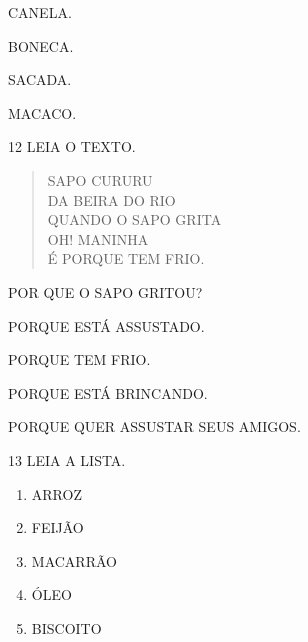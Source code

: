 \begin{escolha}[itemsep=0pt]
\item CANELA.

\item BONECA.

\item SACADA.

\item MACACO.
\end{escolha}

\num{12} LEIA O TEXTO.

\begin{myquote}
\begin{verse}
SAPO CURURU\\
DA BEIRA DO RIO\\
QUANDO O SAPO GRITA\\
OH! MANINHA\\
É PORQUE TEM FRIO.
\end{verse}

\end{myquote}

POR QUE O SAPO GRITOU?

\begin{escolha}
\item PORQUE ESTÁ ASSUSTADO. 

\item PORQUE TEM FRIO.

\item PORQUE ESTÁ BRINCANDO.

\item PORQUE QUER ASSUSTAR SEUS AMIGOS.
\end{escolha}

\pagebreak

\num{13} LEIA A LISTA.

\begin{myquote}
\begin{enumerate}
\item ARROZ

\item FEIJÃO

\item MACARRÃO

\item ÓLEO

\item BISCOITO



\end{enumerate}
\end{myquote}

